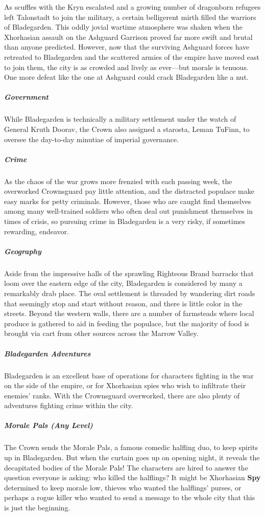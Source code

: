 \documentclass[10pt,a4paper,twoside,bg=print,twocolumn,openany,nodeprecatedcode]{dndbook}
\begin{document}
As scuffles with the Kryn escalated and a growing number of dragonborn refugees left Talonstadt to join the military, a certain belligerent mirth filled the warriors of Bladegarden. This oddly jovial wartime atmosphere was shaken when the Xhorhasian assault on the Ashguard Garrison proved far more swift and brutal than anyone predicted. However, now that the surviving Ashguard forces have retreated to Bladegarden and the scattered armies of the empire have moved east to join them, the city is as crowded and lively as ever—but morale is tenuous. One more defeat like the one at Ashguard could crack Bladegarden like a nut.

\subparagraph{Government}
While Bladegarden is technically a military settlement under the watch of General Kruth Doorav, the Crown also assigned a starosta, Leman TuFinn, to oversee the day-to-day minutiae of imperial governance.

\subparagraph{Crime}
As the chaos of the war grows more frenzied with each passing week, the overworked Crownsguard pay little attention, and the distracted populace make easy marks for petty criminals. However, those who are caught find themselves among many well-trained soldiers who often deal out punishment themselves in times of crisis, so pursuing crime in Bladegarden is a very risky, if sometimes rewarding, endeavor.

\subparagraph{Geography}
Aside from the impressive halls of the sprawling Righteous Brand barracks that loom over the eastern edge of the city, Bladegarden is considered by many a remarkably drab place. The oval settlement is threaded by wandering dirt roads that seemingly stop and start without reason, and there is little color in the streets. Beyond the western walls, there are a number of farmsteads where local produce is gathered to aid in feeding the populace, but the majority of food is brought via cart from other sources across the Marrow Valley.

\subparagraph{Bladegarden Adventures}
Bladegarden is an excellent base of operations for characters fighting in the war on the side of the empire, or for Xhorhasian spies who wish to infiltrate their enemies' ranks. With the Crownsguard overworked, there are also plenty of adventures fighting crime within the city.

\subparagraph{Morale Pals (Any Level)}
The Crown sends the Morale Pals, a famous comedic halfling duo, to keep spirits up in Bladegarden. But when the curtain goes up on opening night, it reveals the decapitated bodies of the Morale Pals! The characters are hired to answer the question everyone is asking: who killed the halflings? It might be Xhorhasian \textbf{Spy} determined to keep morale low, thieves who wanted the halflings' purses, or perhaps a rogue killer who wanted to send a message to the whole city that this is just the beginning.
\end{document}
